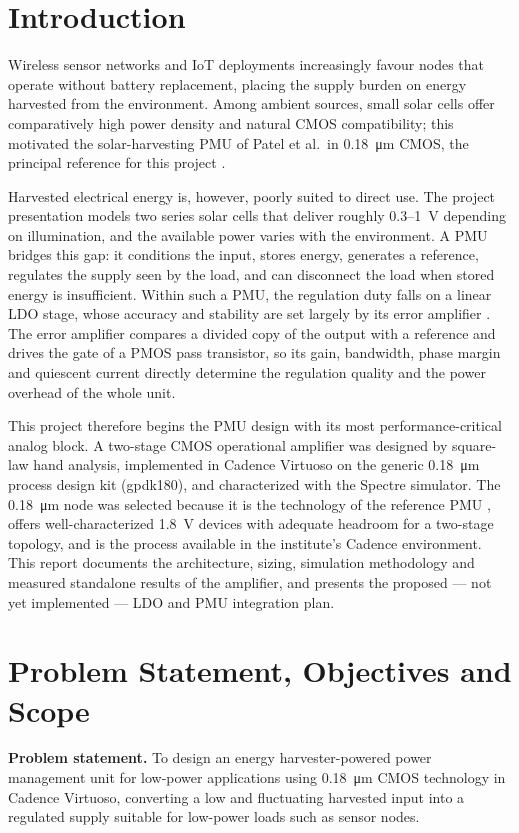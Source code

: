 \documentclass[conference]{IEEEtran}
\begin{document}
\section{Introduction}
Wireless sensor networks and IoT deployments increasingly favour nodes that
operate without battery replacement, placing the supply burden on energy
harvested from the environment. Among ambient sources, small solar cells
offer comparatively high power density and natural CMOS compatibility; this
motivated the solar-harvesting PMU of Patel et al.\ in 0.18~\si{\micro\metre}
CMOS, the principal reference for this project \cite{patel2017}.

Harvested electrical energy is, however, poorly suited to direct use. The
project presentation models two series solar cells that deliver roughly
0.3--1~\si{\volt} depending on illumination, and the available power varies
with the environment. A PMU bridges this gap: it conditions the input, stores
energy, generates a reference, regulates the supply seen by the load, and can
disconnect the load when stored energy is insufficient. Within such a PMU,
the regulation duty falls on a linear LDO stage, whose accuracy and stability
are set largely by its error amplifier \cite{rincon1998,razavi}. The error
amplifier compares a divided copy of the output with a reference and drives
the gate of a PMOS pass transistor, so its gain, bandwidth, phase margin and
quiescent current directly determine the regulation quality and the power
overhead of the whole unit.

This project therefore begins the PMU design with its most
performance-critical analog block. A two-stage CMOS operational amplifier was
designed by square-law hand analysis, implemented in Cadence Virtuoso on the
generic 0.18~\si{\micro\metre} process design kit (gpdk180), and
characterized with the Spectre simulator. The 0.18~\si{\micro\metre} node was
selected because it is the technology of the reference PMU \cite{patel2017},
offers well-characterized \SI{1.8}{\volt} devices with adequate headroom for
a two-stage topology, and is the process available in the institute's Cadence
environment. This report documents the architecture, sizing, simulation
methodology and measured standalone results of the amplifier, and presents
the proposed --- not yet implemented --- LDO and PMU integration plan.

\section{Problem Statement, Objectives and Scope}
\textbf{Problem statement.} To design an energy harvester-powered power
management unit for low-power applications using 0.18~\si{\micro\metre} CMOS
technology in Cadence Virtuoso, converting a low and fluctuating harvested
input into a regulated supply suitable for low-power loads such as sensor
nodes.
\end{document}
